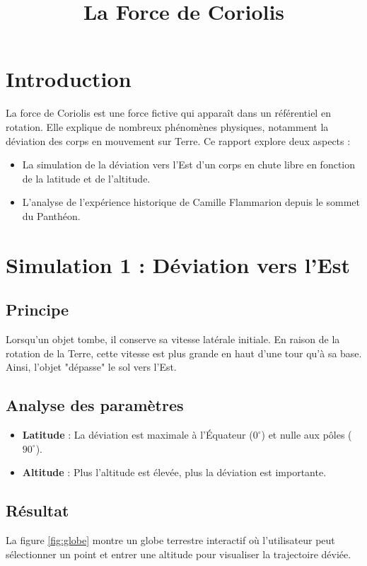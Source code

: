 \documentclass[a4paper,12pt]{article}
\title{La Force de Coriolis}
\author{}
\date{}
\begin{document}
\maketitle

\section{Introduction}
La force de Coriolis est une force fictive qui apparaît dans un référentiel en rotation. Elle explique de nombreux phénomènes physiques, notamment la déviation des corps en mouvement sur Terre. Ce rapport explore deux aspects :
\begin{itemize}
    \item La simulation de la déviation vers l'Est d'un corps en chute libre en fonction de la latitude et de l'altitude.
    \item L'analyse de l'expérience historique de Camille Flammarion depuis le sommet du Panthéon.
\end{itemize}

\section{Simulation 1 : Déviation vers l'Est}
\subsection{Principe}
Lorsqu'un objet tombe, il conserve sa vitesse latérale initiale. En raison de la rotation de la Terre, cette vitesse est plus grande en haut d'une tour qu'à sa base. Ainsi, l'objet "dépasse" le sol vers l'Est.

\subsection{Analyse des paramètres}
\begin{itemize}
    \item \textbf{Latitude} : La déviation est maximale à l'Équateur ($0^\circ$) et nulle aux pôles ($90^\circ$).
    \item \textbf{Altitude} : Plus l'altitude est élevée, plus la déviation est importante.
\end{itemize}

\subsection{Résultat}
La figure \ref{fig:globe} montre un globe terrestre interactif où l'utilisateur peut sélectionner un point et entrer une altitude pour visualiser la trajectoire déviée.
\end{document}

